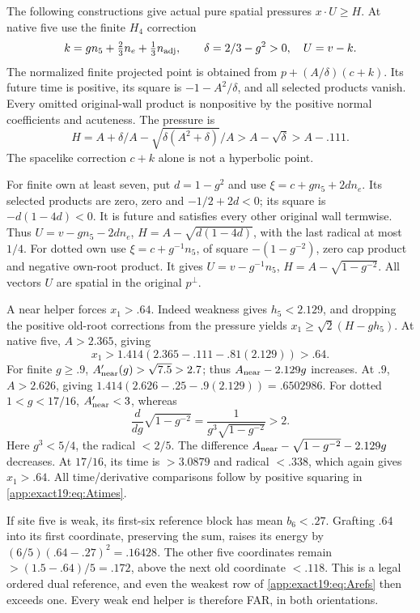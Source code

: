 The following constructions give actual
pure spatial pressures \(x\cdot U\ge H\).
At native five use the finite \(H_4\)
correction
\[
 k=g n_5+\tfrac23n_e+\tfrac13n_{\rm adj},\qquad
 \delta=2/3-g^2>0,\quad U=v-k .
\]
The normalized finite projected point
is obtained from \(p+(A/\delta)(c+k)\).
Its future time is positive, its square
is \(-1-A^2/\delta\), and all selected
products vanish.
Every omitted original-wall product
is nonpositive by the positive
normal coefficients and acuteness.
The pressure is
\[
 H=A+\delta/A-\sqrt{\delta(A^2+\delta)}/A
                   >A-\sqrt\delta>A-.111 .
\]
The spacelike correction \(c+k\)
alone is not a hyperbolic point.

For finite own at least seven,
put \(d=1-g^2\) and use
\(\xi=c+g n_5+2d n_e\).
Its selected products are zero,
zero and \(-1/2+2d<0\);
its square is \(-d(1-4d)<0\).
It is future and satisfies every
other original wall termwise.
Thus \(U=v-g n_5-2d n_e\),
\(H=A-\sqrt{d(1-4d)}\), with the
last radical at most \(1/4\).
For dotted own use
\(\xi=c+g^{-1}n_5\), of square
\(-(1-g^{-2})\), zero cap product
and negative own-root product.
It gives \(U=v-g^{-1}n_5\),
\(H=A-\sqrt{1-g^{-2}}\).
All vectors \(U\) are spatial in
the original \(p^\perp\).

A near helper forces \(x_1>.64\).
Indeed weakness gives \(h_5<2.129\),
and dropping the positive old-root
corrections from the pressure yields
\(x_1\ge\sqrt2(H-gh_5)\).
At native five, \(A>2.365\), giving
\[
              x_1>1.414(2.365-.111-.81(2.129))>.64 .
\]
For finite \(g\ge.9\),
\(A_{\rm near}'(g)>\sqrt{7.5}>2.7\);
thus \(A_{\rm near}-2.129g\) increases.
At \(.9\), \(A>2.626\), giving
\(1.414(2.626-.25-.9(2.129))=.6502986\).
For dotted \(1<g<17/16\),
\(A_{\rm near}'<3\), whereas
\[
                  \frac{d}{dg}\sqrt{1-g^{-2}}
                  =\frac1{g^3\sqrt{1-g^{-2}}}>2 .
\]
Here \(g^3<5/4\), the radical \(<2/5\).
The difference \(A_{\rm near}-\sqrt{1-g^{-2}}-2.129g\)
decreases.
At \(17/16\), its time is \(>3.0879\)
and radical \(<.338\), which again
gives \(x_1>.64\).
All time/derivative comparisons
follow by positive squaring in
\eqref{app:exact19:eq:Atimes}.

If site five is weak, its first-six
reference block has mean \(b_6<.27\).
Grafting \(.64\) into its first
coordinate, preserving the sum,
raises its energy by
\((6/5)(.64-.27)^2=.16428\).
The other five coordinates remain
\(>(1.5-.64)/5=.172\), above the
next old coordinate \(<.118\).
This is a legal ordered dual
reference, and even the weakest
row of \eqref{app:exact19:eq:Arefs}
then exceeds one.
Every weak end helper is therefore
FAR, in both orientations.

